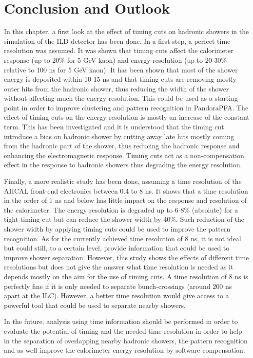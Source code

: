 \section{Conclusion and Outlook}

In this chapter, a first look at the effect of timing cuts on hadronic showers in the \geant simulation of the ILD detector has been done. In a first step, a perfect time resolution was assumed. It was shown that timing cuts affect the calorimeter response (up to 20\% for 5 GeV kaon) and energy resolution (up to 20-30\% relative to 100 ns for 5 GeV kaon). It has been shown that most of the shower energy is deposited within 10-15 ns and that timing cuts are removing mostly outer hits from the hadronic shower, thus reducing the width of the shower without affecting much the energy resolution. This could be used as a starting point in order to improve clustering and pattern recognition in PandoraPFA. The effect of timing cuts on the energy resolution is mostly an increase of the constant term. This has been investigated and it is understood that the timing cut introduce a bias on hadronic shower by cutting away late hits mostly coming from the hadronic part of the shower, thus reducing the hadronic response and enhancing the electromagnetic response. Timing cuts act as a non-compensation effect in the response to hadronic showers thus degrading the energy resolution.

Finally, a more realistic study has been done, assuming a time resolution of the AHCAL front-end electronics between 0.4 to 8 ns. It shows that a time resolution in the order of 1 ns and below has little impact on the response and resolution of the calorimeter. The energy resolution is degraded up to 6-8\% (absolute) for a tight timing cut but can reduce the shower width by 40\%. Such reduction of the shower width by applying timing cuts could be used to improve the pattern recognition. As for the currently achieved time resolution of 8 ns, it is not ideal but could still, to a certain level, provide information that could be used to improve shower separation. However, this study shows the effects of different time resolutions but does not give the answer what time resolution is needed as it depends mostly on the aim for the use of timing cuts. A time resolution of 8 ns is perfectly fine if it is only needed to separate bunch-crossings (around 200 ns apart at the ILC). However, a better time resolution would give access to a powerful tool that could be used to separate nearby showers.

In the future, analysis using time information should be performed in order to evaluate the potential of timing and the needed time resolution in order to help in the separation of overlapping nearby hadronic showers, the pattern recognition and as well improve the calorimeter energy resolution by software compensation.
